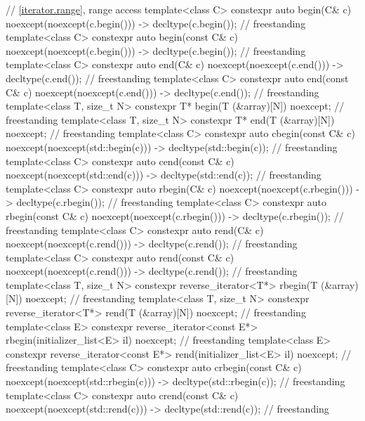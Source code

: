 \begin{codeblock}
{  // \ref{iterator.range}, range access
  template<class C> constexpr auto
    begin(C& c) noexcept(noexcept(c.begin())) -> decltype(c.begin());               // freestanding
  template<class C> constexpr auto
    begin(const C& c) noexcept(noexcept(c.begin())) -> decltype(c.begin());         // freestanding
  template<class C> constexpr auto
    end(C& c) noexcept(noexcept(c.end())) -> decltype(c.end());                     // freestanding
  template<class C> constexpr auto
    end(const C& c) noexcept(noexcept(c.end())) -> decltype(c.end());               // freestanding
  template<class T, size_t N> constexpr T* begin(T (&array)[N]) noexcept;           // freestanding
  template<class T, size_t N> constexpr T* end(T (&array)[N]) noexcept;             // freestanding
  template<class C> constexpr auto
    cbegin(const C& c) noexcept(noexcept(std::begin(c)))
      -> decltype(std::begin(c));                                                   // freestanding
  template<class C> constexpr auto
    cend(const C& c) noexcept(noexcept(std::end(c))) -> decltype(std::end(c));      // freestanding
  template<class C> constexpr auto
    rbegin(C& c) noexcept(noexcept(c.rbegin())) -> decltype(c.rbegin());            // freestanding
  template<class C> constexpr auto
    rbegin(const C& c) noexcept(noexcept(c.rbegin())) -> decltype(c.rbegin());      // freestanding
  template<class C> constexpr auto
    rend(C& c) noexcept(noexcept(c.rend())) -> decltype(c.rend());                  // freestanding
  template<class C> constexpr auto
    rend(const C& c) noexcept(noexcept(c.rend())) -> decltype(c.rend());            // freestanding
  template<class T, size_t N> constexpr reverse_iterator<T*>
    rbegin(T (&array)[N]) noexcept;                                                 // freestanding
  template<class T, size_t N> constexpr reverse_iterator<T*>
    rend(T (&array)[N]) noexcept;                                                   // freestanding
  template<class E> constexpr reverse_iterator<const E*>
    rbegin(initializer_list<E> il) noexcept;                                        // freestanding
  template<class E> constexpr reverse_iterator<const E*>
    rend(initializer_list<E> il) noexcept;                                          // freestanding
  template<class C> constexpr auto
    crbegin(const C& c) noexcept(noexcept(std::rbegin(c)))
      -> decltype(std::rbegin(c));                                                  // freestanding
  template<class C> constexpr auto
    crend(const C& c) noexcept(noexcept(std::rend(c))) -> decltype(std::rend(c));   // freestanding

}
\end{codeblock}
